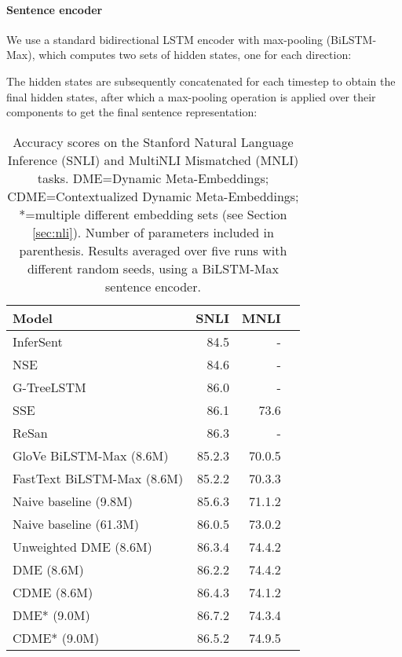 \documentclass[11pt,a4paper]{article}
\begin{document}
\paragraph{Sentence encoder}

We use a standard bidirectional LSTM encoder with max-pooling (BiLSTM-Max), which computes two sets of  hidden states, one for each direction:


\noindent The hidden states are subsequently concatenated for each timestep to obtain the final hidden states, after which a max-pooling operation is applied over their components to get the final sentence representation:



\begin{table}[t]
  \centering
  \small
  \begin{tabular}{lrrr}
    \toprule
    Model & {\small SNLI} & {\small MNLI}\\
    \midrule
    {\small InferSent \cite{Conneau:2017emnlp}} & 84.5 & -\\
    {\small NSE \cite{Munkhdalai:2017acl}} & 84.6 & -\\
    {\small G-TreeLSTM \cite{Choi:2017arxiv}} & 86.0 & -\\
    {\small SSE \cite{Nie:2017arxiv}} & 86.1 & 73.6\\
    {\small ReSan \cite{Shen:2018arxiv}} & 86.3 & -\\
    \midrule
    GloVe BiLSTM-Max {\small (8.6M)} & 85.2.3 & 70.0.5\\
    FastText BiLSTM-Max {\small (8.6M)} & 85.2.2 & 70.3.3\\
    Naive baseline {\small (9.8M)} & 85.6.3 & 71.1.2\\
	Naive baseline {\small (61.3M)} & 86.0.5 & 73.0.2\\\midrule
    Unweighted DME {\small (8.6M)} & 86.3.4 & 74.4.2\\
    DME {\small (8.6M)} & 86.2.2 & 74.4.2\\
CDME {\small (8.6M)} & 86.4.3 & 74.1.2\\\midrule
DME* {\small (9.0M)} & 86.7.2 & 74.3.4\\
	CDME* {\small (9.0M)} & 86.5.2 & 74.9.5\\
\bottomrule
  \end{tabular}
  \caption{\label{table:nli}Accuracy scores on the Stanford Natural Language Inference (SNLI) and MultiNLI Mismatched (MNLI) tasks. DME=Dynamic Meta-Embeddings; CDME=Contextualized Dynamic Meta-Embeddings;  *=multiple different embedding sets (see Section \ref{sec:nli}). Number of parameters included in parenthesis. Results averaged over five runs with different random seeds, using a BiLSTM-Max sentence encoder.}
\end{table}
\end{document}
